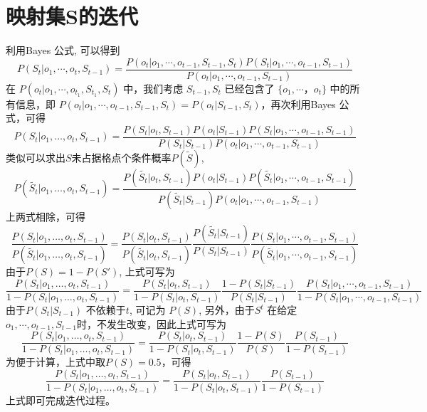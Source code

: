 \section{映射集S的迭代}
利用Bayes 公式, 可以得到
\begin{equation*}
P(S_t|o_1,\cdots,o_t,S_{t-1}) = \dfrac{P(o_t|o_1,\cdots,o_{t-1},S_{t-1},S_t)P(S_t|o_1,\cdots,o_{t-1},S_{t-1})}{P(o_t|o_1,\cdots,o_{t-1},S_{t-1})}
\end{equation*}
在 $P(o_t|o_1,\cdots,o_{t_1},S_{t_1},S_t)$ 中，我们考虑 $S_{t-1}, S_{t}$ 已经包含了 $\{o_1,\cdots，o_t\}$ 中的所有信息，即 $P(o_t|o_1,\cdots,o_{t-1},S_{t-1},S_t) = P(o_t|S_{t-1},S_t)$，再次利用Bayes 公式，可得
\begin{equation*}
P(S_t|o_1,\dots,o_t,S_{t-1}) = \dfrac{P(S_t|o_t,S_{t-1})P(o_t|S_{t-1})P(S_t|o_1,\cdots,o_{t-1},S_{t-1})}{P(S_t|S_{t-1})P(o_t|o_1,\cdots,o_{t-1},S_{t-1})}
\end{equation*}
类似可以求出$S$未占据格点个条件概率$P(\widetilde{S})$,
\begin{equation*}
P(\widetilde{S_t}|o_1,\dots,o_t,S_{t-1}) = \dfrac{P(\widetilde{S_t}|o_t,S_{t-1})P(o_t|S_{t-1})P(\widetilde{S_t}|o_1,\cdots,o_{t-1},S_{t-1})}{P(\widetilde{S_t}|S_{t-1})P(o_t|o_1,\cdots,o_{t-1},S_{t-1})}
\end{equation*}
上两式相除，可得
\begin{equation*}
\dfrac{P(S_t|o_1,\dots,o_t,S_{t-1})}{P(\widetilde{S_t}|o_1,\dots,o_t,S_{t-1})} = \dfrac{P(S_t|o_t,S_{t-1})}{P(\widetilde{S_t}|o_t,S_{t-1})}\dfrac{P(\widetilde{S_t}|S_{t-1})}{P(S_t|S_{t-1})}\dfrac{P(S_t|o_1,\cdots,o_{t-1},S_{t-1})}{P(\widetilde{S_t}|o_1,\cdots,o_{t-1},S_{t-1})}
\end{equation*}
由于$P(S) = 1 - P(S')$, 上式可写为
\begin{equation*}
\dfrac{P(S_t|o_1,\dots,o_t,S_{t-1})}{1-P({S_t}|o_1,\dots,o_t,S_{t-1})} = \dfrac{P(S_t|o_t,S_{t-1})}{1-P({S_t}|o_t,S_{t-1})}\dfrac{1-P({S_t}|S_{t-1})}{P(S_t|S_{t-1})}\dfrac{P(S_t|o_1,\cdots,o_{t-1},S_{t-1})}{1-P({S_t}|o_1,\cdots,o_{t-1},S_{t-1})}
\end{equation*}
由于$P(S_t|S_{t-1})$ 不依赖于$t$, 可记为 $P(S)$, 另外，由于$S^t$ 在给定 $o_1,\cdots,o_{t-1},S_{t-1}$时，不发生改变，因此上式可写为
\begin{equation*}
\dfrac{P(S_t|o_1,\dots,o_t,S_{t-1})}{1-P({S_t}|o_1,\dots,o_t,S_{t-1})} = \dfrac{P(S_t|o_t,S_{t-1})}{1-P({S_t}|o_t,S_{t-1})}\dfrac{1-P(S)}{P(S)}\dfrac{P(S_{t-1})}{1-P(S_{t-1})}
\end{equation*}
为便于计算，上式中取$P(S) = 0.5$，可得
\begin{equation*}
\dfrac{P(S_t|o_1,\dots,o_t,S_{t-1})}{1-P({S_t}|o_1,\dots,o_t,S_{t-1})} = \dfrac{P(S_t|o_t,S_{t-1})}{1-P({S_t}|o_t,S_{t-1})}\dfrac{P(S_{t-1})}{1-P(S_{t-1})}
\end{equation*}
上式即可完成迭代过程。
